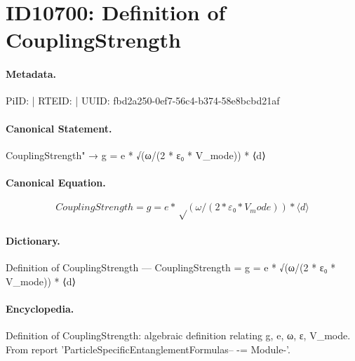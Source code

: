 \section*{ID10700: Definition of CouplingStrength}
\paragraph{Metadata.}
PiID:  | RTEID:  | UUID: fbd2a250-0ef7-56c4-b374-58e8bcbd21af

\paragraph{Canonical Statement.}
CouplingStrength" → g = e * √(ω/(2 * ε₀ * V\_mode)) * ⟨d⟩

\paragraph{Canonical Equation.}
\[
CouplingStrength = g = e * √(ω/(2 * ε₀ * V_mode)) * ⟨d⟩
\]

\paragraph{Dictionary.}
Definition of CouplingStrength — CouplingStrength = g = e * √(ω/(2 * ε₀ * V\_mode)) * ⟨d⟩

\paragraph{Encyclopedia.}
Definition of CouplingStrength: algebraic definition relating g, e, ω, ε, V\_mode. From report 'ParticleSpecificEntanglementFormulas-- -= Module-'.
